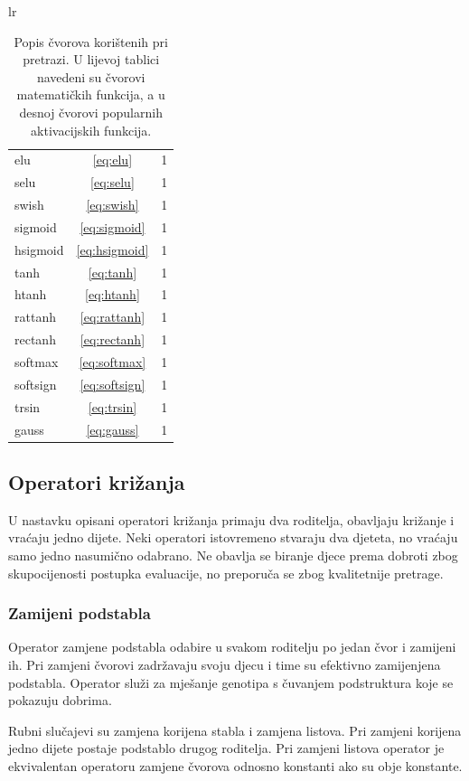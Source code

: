 \documentclass[times, utf8, numeric, diplomski]{fer}
\begin{document}
\begin{table}[H]
\begin{tabular}[t]{lr}
\begin{tabular}[t]{l|c|r}
elu		& \eqref{eq:elu}			& 1 \\
selu		& \eqref{eq:selu}		& 1 \\
swish	& \eqref{eq:swish}		& 1 \\
sigmoid	& \eqref{eq:sigmoid}		& 1 \\
hsigmoid & \eqref{eq:hsigmoid}	& 1 \\
tanh		& \eqref{eq:tanh}		& 1 \\
htanh 	& \eqref{eq:htanh}		& 1 \\
rattanh & \eqref{eq:rattanh}		& 1 \\
rectanh & \eqref{eq:rectanh}		& 1 \\
softmax	& \eqref{eq:softmax}		& 1 \\
softsign	& \eqref{eq:softsign}	& 1 \\
trsin 	& \eqref{eq:trsin}		& 1 \\
gauss	& \eqref{eq:gauss}		& 1 \\
\end{tabular}
\end{tabular}
\caption{Popis čvorova korištenih pri pretrazi. U lijevoj tablici navedeni su čvorovi matematičkih funkcija, a u desnoj čvorovi popularnih aktivacijskih funkcija.}
\end{table}


\subsection{Operatori križanja}
U nastavku opisani operatori križanja primaju dva roditelja, obavljaju križanje i vraćaju jedno dijete. Neki operatori istovremeno stvaraju dva djeteta, no vraćaju samo jedno nasumično odabrano. Ne obavlja se biranje djece prema dobroti zbog skupocijenosti postupka evaluacije, no preporuča se zbog kvalitetnije pretrage.

\subsubsection{Zamijeni podstabla}
Operator zamjene podstabla odabire u svakom roditelju po jedan čvor i zamijeni ih. Pri zamjeni čvorovi zadržavaju svoju djecu i time su efektivno zamijenjena podstabla. Operator služi za mješanje genotipa s čuvanjem podstruktura koje se pokazuju dobrima. %

Rubni slučajevi su zamjena korijena stabla i zamjena listova. Pri zamjeni korijena jedno dijete postaje podstablo drugog roditelja. Pri zamjeni listova operator je ekvivalentan operatoru zamjene čvorova odnosno konstanti ako su obje konstante.
\end{document}
